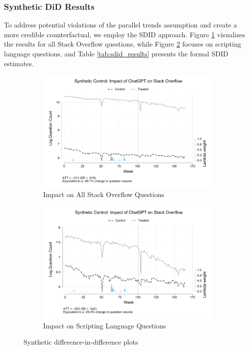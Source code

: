 \subsubsection{Synthetic DiD Results}
To address potential violations of the parallel trends assumption and create a more credible counterfactual, we employ the SDID approach. Figure \ref{fig:sdid_all} visualizes the results for all Stack Overflow questions, while Figure \ref{fig:sdid_script} focuses on scripting language questions, and Table \ref{tab:sdid_results} presents the formal SDID estimates.

\begin{figure}[H]
    \centering
    \begin{subfigure}[b]{0.475\textwidth}
        \centering
        \includegraphics[width=1\textwidth]{imgs/stata/sdid_all_trends101.pdf}
        \caption{Impact on All Stack Overflow Questions}
        \label{fig:sdid_all}
    \end{subfigure}
    \hfill
    \begin{subfigure}[b]{0.475\textwidth}
        \centering
        \includegraphics[width=1\textwidth]{imgs/stata/sdid_script_trends101.pdf}
        \caption{Impact on Scripting Language Questions}
        \label{fig:sdid_script}
    \end{subfigure}
    \caption{Synthetic difference-in-difference plots}
    \label{fig:DiD}
\end{figure}

